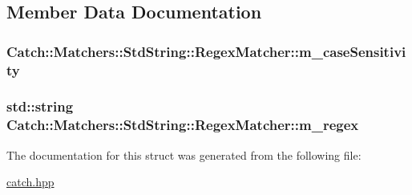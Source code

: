 \subsection{Member Data Documentation}
\hypertarget{struct_catch_1_1_matchers_1_1_std_string_1_1_regex_matcher_afb5fb3d3734c4e882162b51559d09bd4}{
\subsubsection[{m\-\_\-case\-Sensitivity}]{ Catch\-::\-Matchers\-::\-Std\-String\-::\-Regex\-Matcher\-::m\-\_\-case\-Sensitivity\hspace{0.3cm}{\ttfamily [private]}}}\label{struct_catch_1_1_matchers_1_1_std_string_1_1_regex_matcher_afb5fb3d3734c4e882162b51559d09bd4}
\hypertarget{struct_catch_1_1_matchers_1_1_std_string_1_1_regex_matcher_af1020e7266bcfa76ffad011ff89ea14e}{
\subsubsection[{m\-\_\-regex}]{\setlength{\rightskip}{0pt plus 5cm}std\-::string Catch\-::\-Matchers\-::\-Std\-String\-::\-Regex\-Matcher\-::m\-\_\-regex\hspace{0.3cm}{\ttfamily [private]}}}\label{struct_catch_1_1_matchers_1_1_std_string_1_1_regex_matcher_af1020e7266bcfa76ffad011ff89ea14e}


The documentation for this struct was generated from the following file\-:\begin{DoxyCompactItemize}
\item 
\hyperlink{catch_8hpp}{catch.\-hpp}\end{DoxyCompactItemize}
